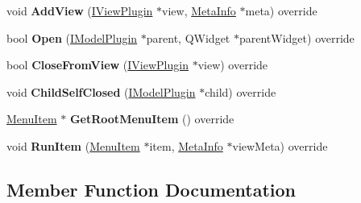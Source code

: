 \begin{DoxyCompactItemize}
\item 
\mbox{\label{class_main_menu_model_plugin_a20caa43ea363917184f39482847b213b}} 
void {\bfseries Add\+View} (\hyperlink{class_i_view_plugin}{I\+View\+Plugin} $\ast$view, \hyperlink{struct_meta_info}{Meta\+Info} $\ast$meta) override
\item 
\mbox{\label{class_main_menu_model_plugin_aee58baef527acb659083fa349b96484f}} 
bool {\bfseries Open} (\hyperlink{class_i_model_plugin}{I\+Model\+Plugin} $\ast$parent, Q\+Widget $\ast$parent\+Widget) override
\item 
\mbox{\label{class_main_menu_model_plugin_a100f1154fc462268747294da601c377a}} 
bool {\bfseries Close\+From\+View} (\hyperlink{class_i_view_plugin}{I\+View\+Plugin} $\ast$view) override
\item 
\mbox{\label{class_main_menu_model_plugin_ac35d70a13e7e8b369fb974b6da5d666c}} 
void {\bfseries Child\+Self\+Closed} (\hyperlink{class_i_model_plugin}{I\+Model\+Plugin} $\ast$child) override
\item 
\mbox{\label{class_main_menu_model_plugin_ab46eb80afb80657bd136bcb52a5e978d}} 
\hyperlink{struct_i_main_menu_plugin_model_1_1_menu_item}{Menu\+Item} $\ast$ {\bfseries Get\+Root\+Menu\+Item} () override
\item 
\mbox{\label{class_main_menu_model_plugin_a837efbbcf266a09a49f4b4987a485b10}} 
void {\bfseries Run\+Item} (\hyperlink{struct_i_main_menu_plugin_model_1_1_menu_item}{Menu\+Item} $\ast$item, \hyperlink{struct_meta_info}{Meta\+Info} $\ast$view\+Meta) override
\end{DoxyCompactItemize}


\subsection{Member Function Documentation}
\mbox{\label{class_main_menu_model_plugin_aedb87208e81b8ee847fc694805364288}} 
